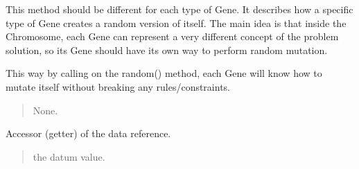\documentclass[letterpaper,10pt,english]{sphinxmanual}
\begin{document}
\begin{fulllineitems}
\begin{fulllineitems}
\begin{quote}
\begin{description}
\end{description}\end{quote}

\end{fulllineitems}


\begin{fulllineitems}
\label{\detokenize{pygenalgo.genome:pygenalgo.genome.gene.Gene.random}}
\pysigstartsignatures
{}
\pysigstopsignatures
\sphinxAtStartPar
This method should be different for each type of Gene. It describes
how a specific type of Gene creates a random version of itself. The
main  idea is that inside the Chromosome, each Gene can represent a
very different concept of the  problem solution, so its Gene should
have its own way to perform random mutation.

\sphinxAtStartPar
This way by calling on the random() method, each Gene will know how
to mutate itself without breaking any rules/constraints.
\begin{quote}\begin{description}
\sphinxAtStartPar
None.

\end{description}\end{quote}

\end{fulllineitems}


\begin{fulllineitems}
\label{\detokenize{pygenalgo.genome:pygenalgo.genome.gene.Gene.value}}
\pysigstartsignatures
{}
\pysigstopsignatures
\sphinxAtStartPar
Accessor (getter) of the data reference.
\begin{quote}\begin{description}
\sphinxAtStartPar
the datum value.

\end{description}\end{quote}

\end{fulllineitems}


\end{fulllineitems}
\end{document}
